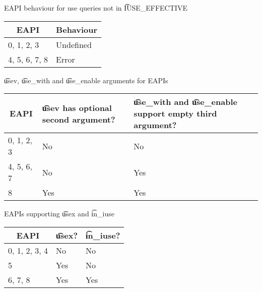 \begin{centertable}{EAPI behaviour for use queries not in \t{IUSE_EFFECTIVE}}
    \label{tab:use-list-strictness}
    \begin{tabular}{ll}
      \toprule
      \multicolumn{1}{c}{\textbf{EAPI}} &
      \multicolumn{1}{c}{\textbf{Behaviour}} \\
      \midrule
      0, 1, 2, 3        & Undefined \\
      4, 5, 6, 7, 8     & Error     \\
      \bottomrule
    \end{tabular}
\end{centertable}

\begin{centertable}{\t{usev}, \t{use_with} and \t{use_enable} arguments for EAPIs}
    \label{tab:use-list-args}
    \begin{tabular}{lll}
      \toprule
      \multicolumn{1}{c}{\textbf{EAPI}} &
      \multicolumn{1}{P{8em}}{\textbf{\t{usev} has optional second argument?}} &
      \multicolumn{1}{P{14em}}{\textbf{\t{use_with} and \t{use_enable} support empty third
        argument?}} \\
      \midrule
      0, 1, 2, 3        & No  & No  \\
      4, 5, 6, 7        & No  & Yes \\
      8                 & Yes & Yes \\
      \bottomrule
    \end{tabular}
\end{centertable}

\begin{centertable}{EAPIs supporting \t{usex} and \t{in_iuse}}
    \label{tab:use-list-functions}
    \begin{tabular}{lll}
      \toprule
      \multicolumn{1}{c}{\textbf{EAPI}} &
      \multicolumn{1}{c}{\textbf{\t{usex}?}} &
      \multicolumn{1}{c}{\textbf{\t{in_iuse}?}} \\
      \midrule
      0, 1, 2, 3, 4     & No  & No  \\
      5                 & Yes & No  \\
      6, 7, 8           & Yes & Yes \\
      \bottomrule
    \end{tabular}
\end{centertable}

